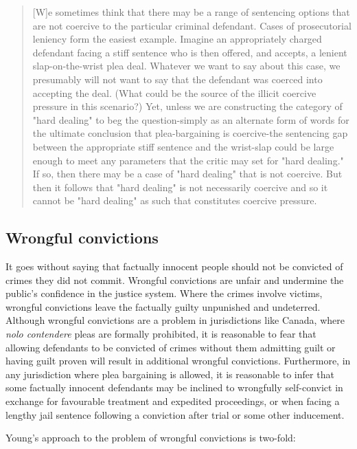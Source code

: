 \begin{quote}
    [W]e sometimes think that there may be a range of sentencing options that are not coercive to the particular criminal defendant. Cases of prosecutorial leniency form the easiest example. Imagine an appropriately charged defendant facing a stiff sentence who is then offered, and accepts, a lenient slap-on-the-wrist plea deal. Whatever we want to say about this case, we presumably will not want to say that the defendant was coerced into accepting the deal. (What could be the source of the illicit coercive pressure in this scenario?) Yet, unless we are constructing the category of "hard dealing" to beg the question-simply as an alternate form of words for the ultimate conclusion that plea-bargaining is coercive-the sentencing gap between the appropriate stiff sentence and the wrist-slap could be large enough to meet any parameters that the critic may set for "hard dealing." If so, then there may be a case of "hard dealing" that is not coercive. But then it follows that "hard dealing" is not necessarily coercive and so it cannot be "hard dealing" as such that constitutes coercive pressure.
\end{quote}




\subsection{Wrongful convictions}

It goes without saying that factually innocent people should not be convicted of crimes they did not commit. Wrongful convictions are unfair and undermine the public's confidence in the justice system. Where the crimes involve victims, wrongful convictions leave the factually guilty unpunished and undeterred. Although wrongful convictions are a problem in jurisdictions like Canada, where \textit{nolo contendere} pleas are formally prohibited, it is reasonable to fear that allowing defendants to be convicted of crimes without them admitting guilt or having guilt proven will result in additional wrongful convictions. Furthermore, in any jurisdiction where plea bargaining is allowed, it is reasonable to infer that some factually innocent defendants may be inclined to wrongfully self-convict in exchange for favourable treatment and expedited proceedings, or when facing a lengthy jail sentence following a conviction after trial or some other inducement. 

Young's approach to the problem of wrongful convictions is two-fold:

